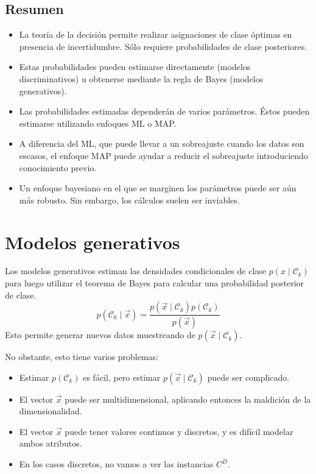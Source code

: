 \subsection{Resumen}
\begin{itemize}
\item La teoría de la decisión permite realizar asignaciones de clase óptimas en presencia de incertidumbre. Sólo requiere probabilidades de clase posteriores.
\item Estas probabilidades pueden estimarse directamente (modelos discriminativos) u obtenerse mediante la regla de Bayes (modelos generativos).
\item Las probabilidades estimadas dependerán de varios parámetros. Éstos pueden estimarse utilizando enfoques ML o MAP.
\item A diferencia del ML, que puede llevar a un sobreajuste cuando los datos son escasos, el enfoque MAP puede ayudar a reducir el sobreajuste introduciendo conocimiento previo.
\item Un enfoque bayesiano en el que se marginen los parámetros puede ser aún más robusto. Sin embargo, los cálculos suelen ser inviables.
\end{itemize}

\section{Modelos generativos}
Los modelos generativos estiman las densidades condicionales de clase $p(x \mid \mathcal{C}_k)$ para luego utilizar el teorema de Bayes para calcular una probabilidad posterior de clase.
$$p(\mathcal{C}_k \mid \vec{x}) = \frac{p(\vec{x} \mid \mathcal{C}_k) p(\mathcal{C}_k)}{p(\vec{x})}$$
Esto permite generar nuevos datos muestreando de $p(\vec{x} \mid \mathcal{C}_k)$.

No obstante, esto tiene varios problemas:
\begin{itemize}
\item Estimar $p(\mathcal{C}_k)$ es fácil, pero estimar $p(\vec{x} \mid \mathcal{C}_k)$ puede ser complicado.
\item El vector $\vec{x}$ puede ser multidimensional, aplicando entonces la maldición de la dimensionalidad.
\item El vector $\vec{x}$ puede tener valores continuos y discretos, y es difícil modelar ambos atributos.
\item En los casos discretos, no vamos a ver las instancias $C^D$.
\end{itemize}

